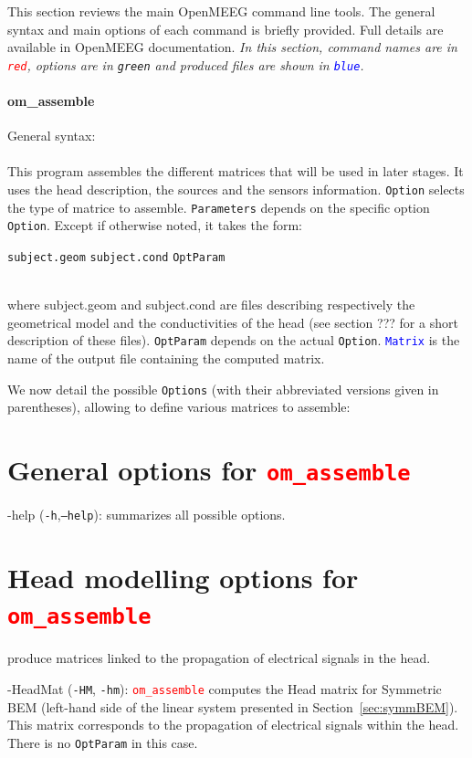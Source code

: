 \documentclass[10pt,journal]{book}
\newcommand{\command}[1]{\framebox[\textwidth][l]{\tt \$ #1}}
\newcommand{\commandTitle}[1]{\paragraph*{\textbf{#1}}}
\newcommand{\commandName}[1]{\textcolor{red}{\tt #1}}
\newcommand{\optionName}[1]{\textcolor{OliveGreen}{\tt #1}}
\newcommand{\outputName}[1]{\textcolor{blue}{\tt #1}}
\newcommand{\Param}[1]{{\tt #1}}
\newenvironment{Options}{
    \begin{list}{}{
        \let\makelabel\OptionsLabel\setlength\labelwidth{30pt}%
        \setlength\leftmargin{\labelwidth+\labelsep}}}
    {\end{list}}
\newcommand*\OptionsLabel[1]{\optionName{#1}}
\begin{document}
This section reviews the main OpenMEEG command line tools. The general syntax and main options of each command is briefly provided.
Full details are available in OpenMEEG documentation. \emph{In this section, command names are in \commandName{red}, options are in \optionName{green} and produced files are shown in \outputName{blue}.}

    \commandTitle{om\_assemble}
        General syntax:\\[2mm]
        \command{\centerline{\commandName{om\_assemble} \optionName{Option} \optionName{Parameters} \outputName{Matrix}}}\\[2mm]
        This program assembles the different matrices that will be used in
        later stages. It uses the head description, the sources and the sensors information. \optionName{Option} selects the type of matrice to assemble. \optionName{Parameters} depends on the specific option \optionName{Option}.
        Except if otherwise noted, it takes the form:\\
        \centerline{\Param{subject.geom} \Param{subject.cond} \optionName{OptParam}}\\
        where subject.geom and subject.cond are files describing respectively the geometrical model and the conductivities of the head (see section ???
        for a short description of these files). \optionName{OptParam} depends on the actual \optionName{Option}. \outputName{Matrix} is the name of the output file
        containing the computed matrix.

    We now detail the possible \optionName{Options} (with their abbreviated versions given in parentheses), allowing to define various matrices to assemble:

        \section{General options for \commandName{om\_assemble}}
            \begin{Options}
                \item[-help] (\optionName{-h},\optionName{--help}):  summarizes all possible options.
            \end{Options}

        \section{Head modelling options for  \commandName{om\_assemble}} produce matrices linked to the propagation of electrical signals in the head.
            \begin{Options}
                \item[-HeadMat] (\optionName{-HM}, \optionName{-hm}): \commandName{om\_assemble} computes the Head matrix for Symmetric BEM (left-hand side
                        of the linear system presented in Section~\ref{sec:symmBEM}). This matrix corresponds to the propagation of electrical signals within the head.
                        There is no \optionName{OptParam} in this case.
            \end{Options}
\end{document}
